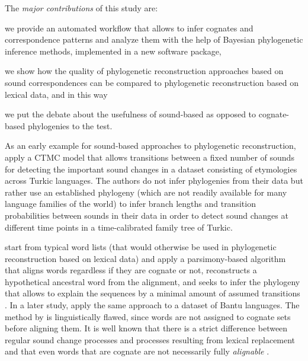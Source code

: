 \documentclass[10pt, a4paper]{article}
\begin{document}
The \textit{major contributions} of this study are:
\begin{inparaenum}[(1)]
\item we 
provide an automated workflow that 
allows
to infer cognates and correspondence patterns and analyze them with
the help of Bayesian phylogenetic inference methods, implemented in a new software package,
\item we show how the quality of phylogenetic reconstruction approaches based on sound correspondences can be compared to phylogenetic reconstruction based on lexical data, and in this way
\item we put the debate about the usefulness of sound-based as opposed to cognate-based phylogenies to the test.
\end{inparaenum}


As an early example for sound-based approaches to phylogenetic reconstruction, \citet{hruschka2015detecting} apply a CTMC model that allows transitions between a fixed number of sounds for detecting the important sound changes in a dataset consisting of etymologies across Turkic languages.
The authors do not infer phylogenies from their data but rather use an established phylogeny (which are not readily available for many language families of the world) to infer branch lengths and transition probabilities between sounds in their data in order to detect sound changes at different time points in a time-calibrated family tree of Turkic. 

\citet{Wheeler2015b} start from typical word lists (that would otherwise be used in phylogenetic reconstruction based on lexical data) and apply a parsimony-based algorithm that aligns words regardless if they are cognate or not, reconstructs a hypothetical ancestral word from the alignment, and seeks to infer the phylogeny that allows to explain the sequences by a minimal amount of assumed transitions \citep{Sankoff1975}. In a later study, \citet{Whiteley2019} apply the same approach to a dataset of Bantu languages. The method by \citet{Wheeler2015b} is linguistically flawed, since words are not assigned to cognate sets before aligning them. It is well known that there is a strict difference between regular sound change processes and processes resulting from lexical replacement \citep{Hall2010} and that even words that are cognate are not necessarily fully \emph{alignable}
\citep[10]{Schweikhard2020}.
\end{document}
